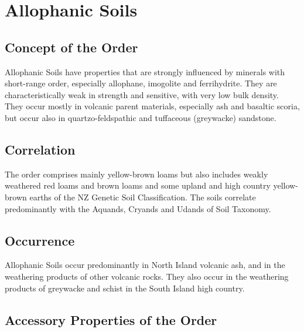 \documentclass[
  letterpaper,
  DIV=11,
  numbers=noendperiod]{scrreprt}
\begin{document}

\hypertarget{sec-sec-ord-L}{%
\chapter{Allophanic Soils}\label{sec-sec-ord-L}}

\hypertarget{sec-sec-con-L}{%
\section{Concept of the Order}\label{sec-sec-con-L}}

Allophanic Soils have properties that are strongly influenced by
minerals with short-range order, especially allophane, imogolite and
ferrihydrite. They are characteristically weak in strength and
sensitive, with very low bulk density. They occur mostly in volcanic
parent materials, especially ash and basaltic scoria, but occur also in
quartzo-feldspathic and tuffaceous (greywacke) sandstone.

\hypertarget{sec-cor-L}{%
\section{Correlation}\label{sec-cor-L}}

The order comprises mainly yellow-brown loams but also includes weakly
weathered red loams and brown loams and some upland and high country
yellow-brown earths of the NZ Genetic Soil Classification. The soils
correlate predominantly with the Aquands, Cryands and Udands of Soil
Taxonomy.

\hypertarget{sec-occ-L}{%
\section{Occurrence}\label{sec-occ-L}}

Allophanic Soils occur predominantly in North Island volcanic ash, and
in the weathering products of other volcanic rocks. They also occur in
the weathering products of greywacke and schist in the South Island high
country.

\hypertarget{sec-acc-L}{%
\section{Accessory Properties of the Order}\label{sec-acc-L}}
\end{document}

